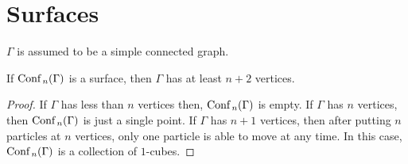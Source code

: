 \chapter{Surfaces}
\(\Gamma\) is assumed to be a simple connected graph.

\begin{lem}
\label{lem:is_surface_0}
If \(\text{Conf}\,_n(\Gamma)\) is a surface, then \(\Gamma\) has at least \(n+2\) vertices.
\end{lem}
\begin{proof}
    If \(\Gamma\) has less than \(n\) vertices then, \(\text{Conf}\,_n(\Gamma)\) is empty.
    If \(\Gamma\) has \(n\) vertices, then \(\text{Conf}\,_n(\Gamma)\) is just a single point.
    If \(\Gamma\) has \(n + 1\) vertices, then after putting \(n\) particles at \(n\) vertices, only one particle is able to move at any time.
    In this case, \(\text{Conf}\,_n(\Gamma)\) is a collection of \(1\)-cubes.
\end{proof}

\begin{figure}
    \centering
{}
\end{figure}


